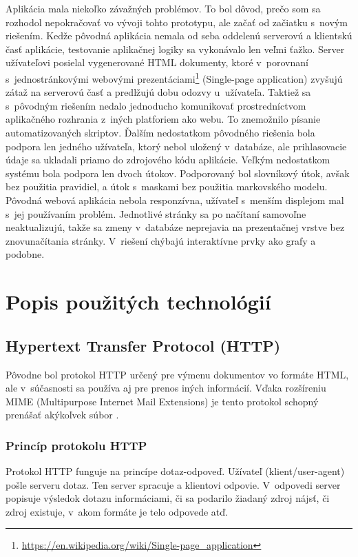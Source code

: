 \documentclass[zadani,slovak]{fitthesis}
\begin{document}
\noindent
Aplikácia mala niekoľko závažných problémov. To bol dôvod, prečo som sa rozhodol nepokračovať vo vývoji tohto prototypu, ale začať od začiatku s~novým riešením. Kedže pôvodná aplikácia nemala od seba oddelenú serverovú a klientskú časť aplikácie, testovanie aplikačnej logiky sa vykonávalo len veľmi ťažko. Server užívateľovi posielal vygenerované HTML dokumenty, ktoré v~porovnaní s~jednostránkovými webovými prezentáciami\footnote{\url{https://en.wikipedia.org/wiki/Single-page_application}} (Single-page application) zvyšujú zátaž na serverovú časť a predlžujú dobu odozvy u~užívateľa. Taktiež sa s~pôvodným riešením nedalo jednoducho komunikovať prostredníctvom aplikačného rozhrania z~iných platforiem ako webu. To znemožnilo písanie automatizovaných skriptov. Ďalším nedostatkom pôvodného riešenia bola podpora len jedného užívateľa, ktorý nebol uložený v~databáze, ale prihlasovacie údaje sa ukladali priamo do zdrojového kódu aplikácie. Veľkým nedostatkom systému bola podpora len dvoch útokov. Podporovaný bol slovníkový útok, avšak bez použitia pravidiel, a útok s~maskami bez použitia markovského modelu. Pôvodná webová aplikácia nebola responzívna, užívateľ s~menším displejom mal s~jej používaním problém. Jednotlivé stránky sa po načítaní samovoľne neaktualizujú, takže sa zmeny v~databáze neprejavia na prezentačnej vrstve bez znovunačítania stránky. V~riešení chýbajú interaktívne prvky ako grafy a podobne.


\chapter{Popis použitých technológií}\label{technologie}


\section{Hypertext Transfer Protocol (HTTP)}\label{http}
Pôvodne bol protokol HTTP určený pre výmenu dokumentov vo formáte HTML, ale v~súčasnosti sa používa aj pre prenos iných informácií. Vďaka rozšíreniu MIME (Multipurpose Internet Mail Extensions) je tento protokol schopný prenášať akýkoľvek súbor \cite{httpRFC}.

\subsection{Princíp protokolu HTTP}
Protokol HTTP funguje na princípe dotaz-odpoveď. Užívateľ (klient/user-agent) pošle serveru dotaz. Ten server spracuje a klientovi odpovie. V~odpovedi server popisuje výsledok dotazu informáciami, či sa podarilo žiadaný zdroj nájsť, či zdroj existuje, v~akom formáte je telo odpovede atď.
\end{document}
